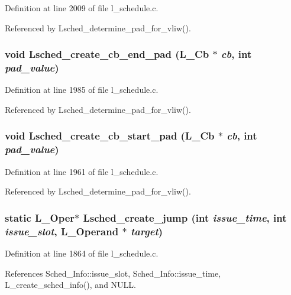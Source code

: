 Definition at line 2009 of file l\_\-schedule.c.

Referenced by Lsched\_\-determine\_\-pad\_\-for\_\-vliw().
\subsubsection{\setlength{\rightskip}{0pt plus 5cm}void Lsched\_\-create\_\-cb\_\-end\_\-pad (L\_\-Cb $\ast$ {\em cb}, int {\em pad\_\-value})}\label{l__schedule_8c_d3e42788dce5fe5bece79fd15af24462}




Definition at line 1985 of file l\_\-schedule.c.

Referenced by Lsched\_\-determine\_\-pad\_\-for\_\-vliw().
\subsubsection{\setlength{\rightskip}{0pt plus 5cm}void Lsched\_\-create\_\-cb\_\-start\_\-pad (L\_\-Cb $\ast$ {\em cb}, int {\em pad\_\-value})}\label{l__schedule_8c_c26c26ff3edd8f6887aaf172c38fcfd2}




Definition at line 1961 of file l\_\-schedule.c.

Referenced by Lsched\_\-determine\_\-pad\_\-for\_\-vliw().
\subsubsection{\setlength{\rightskip}{0pt plus 5cm}static L\_\-Oper$\ast$ Lsched\_\-create\_\-jump (int {\em issue\_\-time}, int {\em issue\_\-slot}, L\_\-Operand $\ast$ {\em target})\hspace{0.3cm}{\tt  [static]}}\label{l__schedule_8c_b274a5699dfc00ff67c351458a2703ad}




Definition at line 1864 of file l\_\-schedule.c.

References Sched\_\-Info::issue\_\-slot, Sched\_\-Info::issue\_\-time, L\_\-create\_\-sched\_\-info(), and NULL.

